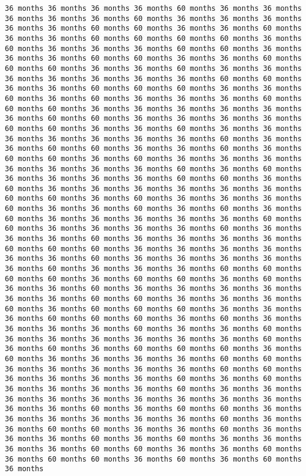 \documentclass[11pt]{article}
\begin{document}
\begin{Verbatim}[commandchars=\\\{\}, frame=single, framerule=2mm, rulecolor=\color{outerrorbackground}]
36 months 36 months 36 months 36 months 60 months 36 months 36 months 36 months 36 months 36 months 60 months 36 months 36 months 36 months 36 months 36 months 60 months 60 months 36 months 36 months 60 months 36 months 36 months 60 months 60 months 60 months 60 months 36 months 60 months 36 months 36 months 36 months 60 months 60 months 36 months 36 months 36 months 60 months 60 months 36 months 36 months 60 months 60 months 60 months 36 months 36 months 60 months 36 months 36 months 36 months 36 months 36 months 36 months 36 months 60 months 60 months 36 months 36 months 60 months 60 months 60 months 36 months 36 months 60 months 36 months 60 months 36 months 36 months 36 months 60 months 60 months 60 months 36 months 36 months 36 months 36 months 36 months 36 months 60 months 60 months 36 months 36 months 36 months 36 months 60 months 60 months 36 months 36 months 60 months 36 months 36 months 36 months 36 months 36 months 36 months 36 months 60 months 36 months 36 months 60 months 60 months 36 months 36 months 60 months 36 months 60 months 60 months 36 months 60 months 36 months 36 months 36 months 36 months 36 months 36 months 36 months 60 months 36 months 60 months 36 months 36 months 36 months 36 months 60 months 60 months 36 months 60 months 36 months 36 months 36 months 36 months 36 months 36 months 60 months 60 months 36 months 60 months 36 months 36 months 36 months 60 months 36 months 36 months 60 months 36 months 60 months 36 months 60 months 36 months 36 months 36 months 36 months 36 months 60 months 60 months 36 months 36 months 36 months 36 months 60 months 36 months 36 months 36 months 60 months 36 months 36 months 36 months 36 months 60 months 60 months 60 months 36 months 36 months 36 months 36 months 36 months 36 months 60 months 36 months 36 months 36 months 36 months 36 months 60 months 36 months 36 months 36 months 60 months 60 months 60 months 60 months 36 months 60 months 60 months 36 months 60 months 36 months 36 months 60 months 36 months 36 months 36 months 36 months 36 months 36 months 60 months 60 months 36 months 36 months 36 months 60 months 36 months 60 months 60 months 60 months 36 months 36 months 36 months 60 months 60 months 60 months 36 months 60 months 36 months 36 months 36 months 36 months 60 months 36 months 36 months 60 months 36 months 36 months 36 months 36 months 36 months 36 months 60 months 36 months 60 months 36 months 60 months 60 months 60 months 36 months 60 months 36 months 36 months 36 months 36 months 60 months 60 months 36 months 36 months 36 months 36 months 36 months 60 months 60 months 36 months 36 months 36 months 36 months 60 months 36 months 60 months 36 months 36 months 36 months 36 months 60 months 36 months 36 months 36 months 36 months 36 months 36 months 36 months 36 months 36 months 36 months 36 months 60 months 36 months 60 months 60 months 36 months 36 months 36 months 36 months 36 months 36 months 60 months 36 months 36 months 60 months 60 months 36 months 36 months 60 months 36 months 36 months 36 months 60 months 36 months 60 months 36 months 36 months 36 months 36 months 60 months 60 months 36 months 36 months 60 months 36 months 60 months 60 months 36 months 60 months 36 months 60 months 36 months 
\end{Verbatim}
\end{document}
